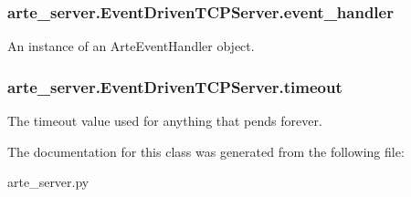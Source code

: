 \subsubsection[{event\+\_\+handler}]{\setlength{\rightskip}{0pt plus 5cm}arte\+\_\+server.\+Event\+Driven\+T\+C\+P\+Server.\+event\+\_\+handler}\label{classarte__server_1_1_event_driven_t_c_p_server_ae16df161725349e69a81d04b5e44149e}


An instance of an Arte\+Event\+Handler object. 

\subsubsection[{timeout}]{\setlength{\rightskip}{0pt plus 5cm}arte\+\_\+server.\+Event\+Driven\+T\+C\+P\+Server.\+timeout}\label{classarte__server_1_1_event_driven_t_c_p_server_ad5526185d299676292d760a782b7c0fa}


The timeout value used for anything that pends forever. 



The documentation for this class was generated from the following file\+:\begin{DoxyCompactItemize}
\item 
arte\+\_\+server.\+py\end{DoxyCompactItemize}
